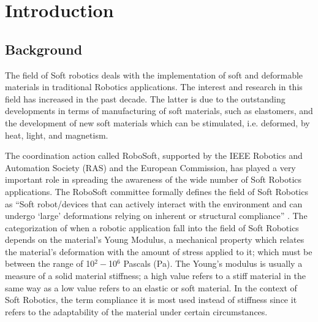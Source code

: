\chapter{Introduction} \label{ch1:introduction}
\section{ Background}

The field of Soft robotics deals with the implementation of soft and deformable materials in traditional Robotics applications. The interest and research in this field has increased in the past decade. The latter is due to the outstanding developments in terms of manufacturing of soft materials, such as elastomers, and the development of new soft materials which can be stimulated, i.e. deformed, by heat, light, and magnetism. 

The coordination action called RoboSoft, supported by the IEEE Robotics and Automation Society (RAS) and the European Commission, has played a very important role in spreading the awareness of the wide number of Soft Robotics applications. The RoboSoft committee formally defines the field of Soft Robotics as ``Soft robot/devices that can actively interact with the environment and can undergo `large' deformations relying on inherent or structural compliance'' \cite{laschi2016soft}. The categorization of when a robotic application fall into the field of Soft Robotics depends on the material's Young Modulus, a mechanical property which relates the material's deformation with the amount of stress applied to it; which must be between the range of 10$^{2} - $10$^{6}$ Pascals (Pa). The Young's modulus is usually a measure of a solid material stiffness; a high value refers to a stiff material in the same way as a low value refers to an elastic or soft material. In the context of Soft Robotics, the term compliance it is most used instead of stiffness since it refers to the adaptability of the material under certain circumstances.


